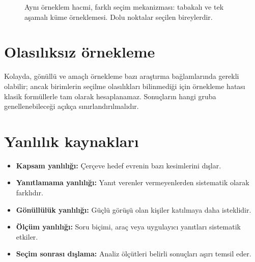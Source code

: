 \begin{figure}[H]
\centering
{}
\caption{Aynı örneklem hacmi, farklı seçim mekanizması: tabakalı ve tek
aşamalı küme örneklemesi. Dolu noktalar seçilen bireylerdir.}
\label{fig:strata-clusters}
\end{figure}

\section{Olasılıksız örnekleme}
\label{sec:sampling-nonprobability}

Kolayda, gönüllü ve amaçlı örnekleme bazı araştırma bağlamlarında gerekli
olabilir; ancak birimlerin seçilme olasılıkları bilinmediği için örnekleme
hatası klasik formüllerle tam olarak hesaplanamaz. Sonuçların hangi gruba
genellenebileceği açıkça sınırlandırılmalıdır.

\section{Yanlılık kaynakları}
\label{sec:sampling-bias-sources}

\begin{itemize}
  \item \textbf{Kapsam yanlılığı:} Çerçeve hedef evrenin bazı kesimlerini dışlar.
  \item \textbf{Yanıtlamama yanlılığı:} Yanıt verenler vermeyenlerden sistematik olarak farklıdır.
  \item \textbf{Gönüllülük yanlılığı:} Güçlü görüşü olan kişiler katılmaya daha isteklidir.
  \item \textbf{Ölçüm yanlılığı:} Soru biçimi, araç veya uygulayıcı yanıtları sistematik etkiler.
  \item \textbf{Seçim sonrası dışlama:} Analiz ölçütleri belirli sonuçları aşırı temsil eder.
\end{itemize}

